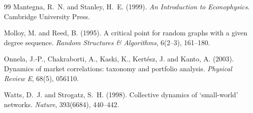 \documentclass[11pt, a4paper]{article}
\begin{document}
\begin{thebibliography}{99}
Mantegna, R.~N. and Stanley, H.~E. (1999).
\newblock \emph{An Introduction to Econophysics}.
\newblock Cambridge University Press.

Molloy, M. and Reed, B. (1995).
\newblock A critical point for random graphs with a given degree sequence.
\newblock \emph{Random Structures \& Algorithms}, 6(2--3), 161--180.

Onnela, J.-P., Chakraborti, A., Kaski, K., Kert\'esz, J. and Kanto, A. (2003).
\newblock Dynamics of market correlations: taxonomy and portfolio analysis.
\newblock \emph{Physical Review E}, 68(5), 056110.

Watts, D.~J. and Strogatz, S.~H. (1998).
\newblock Collective dynamics of `small-world' networks.
\newblock \emph{Nature}, 393(6684), 440--442.

\end{thebibliography}
\end{document}

